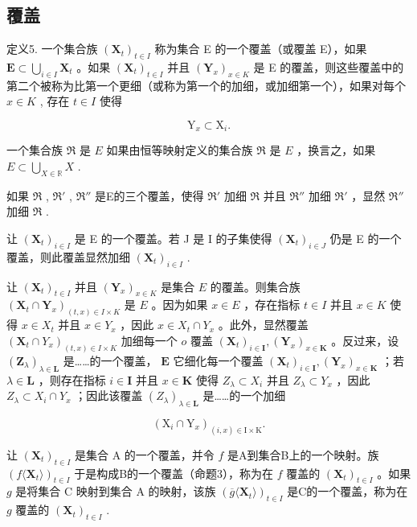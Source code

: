 \subsection{覆盖}

定义5. 一个集合族 \((\mathbf{X}_t)_{t \in I}\) 称为集合 E 的一个覆盖（或覆盖 E），如果 \(\mathbf{E} \subset \bigcup_{i \in I} \mathbf{X}_t\) 。如果 \((\mathbf{X}_t)_{t \in I}\) 并且 \((\mathbf{Y}_x)_{x \in K}\) 是 E 的覆盖，则这些覆盖中的第二个被称为比第一个更细（或称为第一个的加细，或加细第一个），如果对每个 \(x \in K\) , 存在 \(t \in I\) 使得

\[
\mathrm{Y} _ {x} \subset \mathrm{X} _ {i}.
\]

一个集合族 \(\Re\) 是 \(E\) 如果由恒等映射定义的集合族 \(\Re\) 是 \(E\) ，换言之，如果 \(E \subset \bigcup_{X \in \mathbb{R}} X\) .

如果 \(\Re\) , \(\Re'\) , \(\Re''\) 是E的三个覆盖，使得 \(\Re'\) 加细 \(\Re\) 并且 \(\Re''\) 加细 \(\Re'\) ，显然 \(\Re''\) 加细 \(\Re\) .

让 \((\mathbf{X}_t)_{i\in I}\) 是 E 的一个覆盖。若 J 是 I 的子集使得 \((\mathbf{X}_t)_{i\in J}\) 仍是 E 的一个覆盖，则此覆盖显然加细 \((\mathbf{X}_t)_{i\in I}\) .

让 \((\mathbf{X}_t)_{t \in I}\) 并且 \((\mathbf{Y}_x)_{x \in K}\) 是集合 \(E\) 的覆盖。则集合族 \((\mathbf{X}_t \cap \mathbf{Y}_x)_{(t,x) \in I \times K}\) 是 \(E\) 。因为如果 \(x \in E\) ，存在指标 \(t \in I\) 并且 \(x \in K\) 使得 \(x \in X_t\) 并且 \(x \in Y_x\) ，因此 \(x \in X_t \cap Y_x\) 。此外，显然覆盖 \((\mathbf{X}_t \cap Y_x)_{(t,x) \in I \times K}\) 加细每一个 \(o\) 覆盖 \((\mathbf{X}_t)_{i\in \mathbf{I}}, (\mathbf{Y}_x)_{x\in \mathbf{K}}\) 。反过来，设 \((\mathbf{Z}_{\lambda})_{\lambda \in \mathbf{L}}\) 是……的一个覆盖， \(\mathbf{E}\) 它细化每一个覆盖 \((\mathbf{X}_t)_{i\in \mathbf{I}}, (\mathbf{Y}_x)_{x\in \mathbf{K}}\) ；若 \(\lambda \in \mathbf{L}\) ，则存在指标 \(i\in \mathbf{I}\) 并且 \(x\in \mathbf{K}\) 使得 \(Z_{\lambda}\subset X_{i}\) 并且 \(Z_{\lambda}\subset Y_{x}\) ，因此 \(Z_{\lambda}\subset X_{i}\cap Y_{x}\) ；因此该覆盖 \((Z_{\lambda})_{\lambda \in \mathbf{L}}\) 是……的一个加细

\[
\left(\mathrm{X} _ {i} \cap \mathrm{Y} _ {x}\right) _ {(i, x) \in \mathrm{I} \times \mathrm{K}}.
\]

让 \((\mathbf{X}_t)_{t\in I}\) 是集合 A 的一个覆盖，并令 \(f\) 是A到集合B上的一个映射。族 \((f\langle \mathbf{X}_t\rangle)_{t\in I}\) 于是构成B的一个覆盖（命题3），称为在 \(f\) 覆盖的 \((\mathbf{X}_t)_{t\in I}\) 。如果 \(g\) 是将集合 C 映射到集合 A 的映射，该族 \((\overline{g}\langle \mathbf{X}_t\rangle)_{t\in I}\) 是C的一个覆盖，称为在 \(g\) 覆盖的 \((\mathbf{X}_t)_{t\in I}\) .

